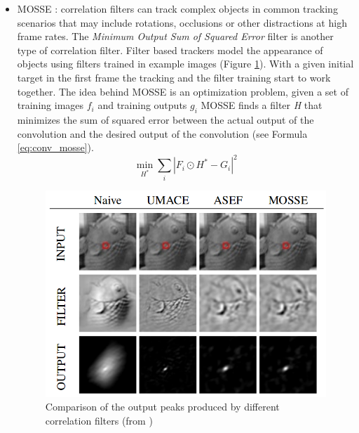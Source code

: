 \begin{itemize}
\item MOSSE \cite{bolme2010visual}: correlation filters can track complex objects in common tracking scenarios that may include rotations, occlusions or other distractions at high frame rates. The \textit{Minimum Output Sum of Squared Error} filter is another type of correlation filter. Filter based trackers model the appearance of objects using filters trained in example images (Figure \ref{fig:mosse}). With a given initial target in the first frame the tracking and the filter training start to work together. The idea behind MOSSE is an optimization problem, given a set of training images $f_i$ and training outputs $g_i$ MOSSE finds a filter \textit{H} that minimizes the sum of squared error between the actual output of the convolution and the desired output of the convolution (see Formula \ref{eq:conv_mosse}).
\begin{equation}
\min_{H^*}\sum_{i}\left|F_i \odot H^* - G_i\right|^2
\label{eq:conv_mosse}
\end{equation}

\begin{figure}[h!]
\begin{center}
\includegraphics[scale=0.35]{figures/mosse_filter.png}
\caption{Comparison of the output peaks produced by different correlation filters (from \cite{bolme2010visual})}
\label{fig:mosse}
\end{center}
\end{figure} 


\end{itemize}
